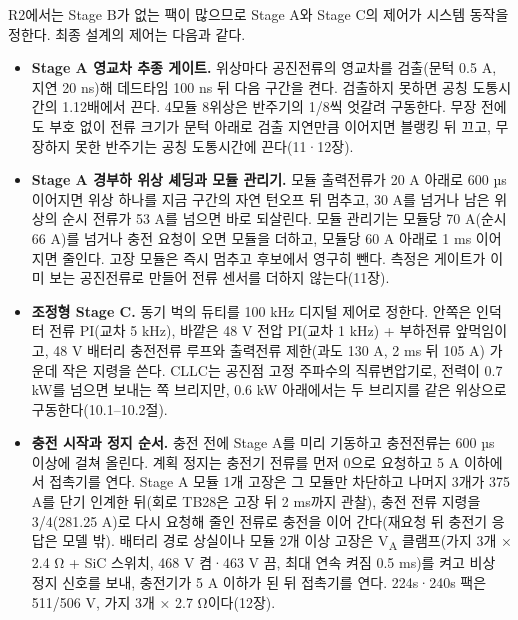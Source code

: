 R2에서는 Stage B가 없는 팩이 많으므로 Stage A와 Stage C의 제어가 시스템 동작을 정한다. 최종 설계의 제어는 다음과 같다.

\begin{itemize}
\item \textbf{Stage A 영교차 추종 게이트.} 위상마다 공진전류의 영교차를 검출(문턱 0.5 A, 지연 20 ns)해 데드타임 100 ns 뒤 다음 구간을 켠다. 검출하지 못하면 공칭 도통시간의 1.12배에서 끈다. 4모듈 8위상은 반주기의 1/8씩 엇갈려 구동한다. 무장 전에도 부호 없이 전류 크기가 문턱 아래로 검출 지연만큼 이어지면 블랭킹 뒤 끄고, 무장하지 못한 반주기는 공칭 도통시간에 끈다(11·12장).
\item \textbf{Stage A 경부하 위상 셰딩과 모듈 관리기.} 모듈 출력전류가 20 A 아래로 600 µs 이어지면 위상 하나를 지금 구간의 자연 턴오프 뒤 멈추고, 30 A를 넘거나 남은 위상의 순시 전류가 53 A를 넘으면 바로 되살린다. 모듈 관리기는 모듈당 70 A(순시 66 A)를 넘거나 충전 요청이 오면 모듈을 더하고, 모듈당 60 A 아래로 1 ms 이어지면 줄인다. 고장 모듈은 즉시 멈추고 후보에서 영구히 뺀다. 측정은 게이트가 이미 보는 공진전류로 만들어 전류 센서를 더하지 않는다(11장).
\item \textbf{조정형 Stage C.} 동기 벅의 듀티를 100 kHz 디지털 제어로 정한다. 안쪽은 인덕터 전류 PI(교차 5 kHz), 바깥은 48 V 전압 PI(교차 1 kHz) + 부하전류 앞먹임이고, 48 V 배터리 충전전류 루프와 출력전류 제한(과도 130 A, 2 ms 뒤 105 A) 가운데 작은 지령을 쓴다. CLLC는 공진점 고정 주파수의 직류변압기로, 전력이 0.7 kW를 넘으면 보내는 쪽 브리지만, 0.6 kW 아래에서는 두 브리지를 같은 위상으로 구동한다(10.1–10.2절).
\item \textbf{충전 시작과 정지 순서.} 충전 전에 Stage A를 미리 기동하고 충전전류는 600 µs 이상에 걸쳐 올린다. 계획 정지는 충전기 전류를 먼저 0으로 요청하고 5 A 이하에서 접촉기를 연다. Stage A 모듈 1개 고장은 그 모듈만 차단하고 나머지 3개가 375 A를 단기 인계한 뒤(회로 TB28은 고장 뒤 2 ms까지 관찰), 충전 전류 지령을 3/4(281.25 A)로 다시 요청해 줄인 전류로 충전을 이어 간다(재요청 뒤 충전기 응답은 모델 밖). 배터리 경로 상실이나 모듈 2개 이상 고장은 V\textsubscript{A} 클램프(가지 3개 × 2.4 Ω + SiC 스위치, 468 V 켬·463 V 끔, 최대 연속 켜짐 0.5 ms)를 켜고 비상 정지 신호를 보내, 충전기가 5 A 이하가 된 뒤 접촉기를 연다. 224s·240s 팩은 511/506 V, 가지 3개 × 2.7 Ω이다(12장).
\end{itemize}
